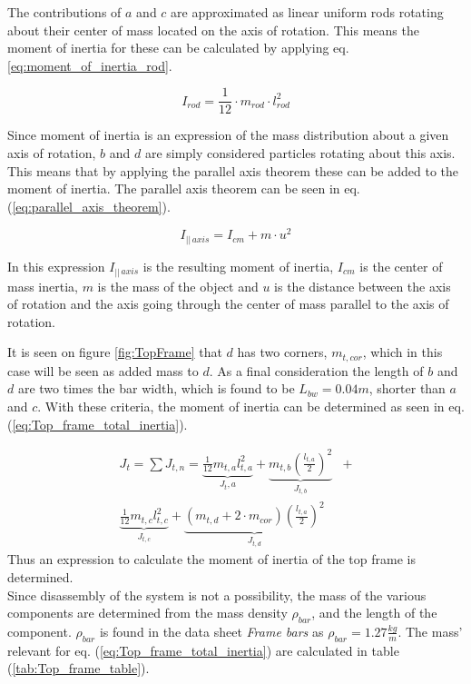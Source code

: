 \documentclass[../../main]{subfiles}
\begin{document}
The contributions of $a$ and $c$ are approximated as linear uniform rods rotating about their center of mass located on the axis of rotation. This means the moment of inertia for these can be calculated by applying eq. \ref{eq:moment_of_inertia_rod}.

\begin{equation}
  \label{eq:moment_of_inertia_rod}
  I_{rod}=\frac{1}{12}\cdot m_{rod} \cdot l_{rod}^2
\end{equation}

Since moment of inertia is an expression of the mass distribution about a given axis of rotation, $b$ and $d$ are simply considered particles rotating about this axis. This means that by applying the parallel axis theorem these can be added to the moment of inertia. The parallel axis theorem can be seen in eq. (\ref{eq:parallel_axis_theorem}).

\begin{equation}
  \label{eq:parallel_axis_theorem}
  I_{||\,axis} = I_{cm} + m\cdot u^2
\end{equation}

In this expression $I_{||\,axis}$ is the resulting moment of inertia, $I_{cm}$ is the center of mass inertia, $m$ is the mass of the object and $u$ is the distance between the axis of rotation and the axis going through the center of mass parallel to the axis of rotation.

It is seen on figure \ref{fig:TopFrame} that $d$ has two corners, $m_{t,cor}$, which in this case will be seen as added mass to $d$. As a final consideration the length of $b$ and $d$ are two times the bar width, which is found to be $L_{bw} = 0.04m$, shorter than $a$ and $c$. With these criteria, the moment of inertia can be determined as seen in eq. (\ref{eq:Top_frame_total_inertia}).

\begin{equation}
  \label{eq:Top_frame_total_inertia}
\begin{split}
  J_t = \sum J_{t,n} =
  \underbrace{\frac{1}{12}m_{t,a}l_{t,a}^2}_\text{$J_t,a$} +
  \underbrace{m_{t,b}\left(\frac{l_{t,a}}{2}\right)^2}_\text{$J_{t,b}$} &+ \\
  \underbrace{ \frac{1}{12} m_{t,c}l_{t,c}^2}_\text{$J_{t,c}$} +
  \underbrace{(m_{t,d} + 2\cdot m_{cor})\left(\frac{l_{t,a}}{2}\right)^2}_\text{$J_{t,d}$}
\end{split}
\end{equation}
Thus an expression to calculate the moment of inertia of the top frame is determined.\\
Since disassembly of the system is not a possibility, the mass of the various components are determined from the mass density $\rho_{bar}$, and the length of the component. $\rho_{bar}$ is found in the data sheet \textit{Frame bars} as $\rho_{bar} = 1.27 \si{\frac{kg}{m}}$. The mass' relevant for eq. (\ref{eq:Top_frame_total_inertia}) are calculated in table (\ref{tab:Top_frame_table}).
\end{document}
